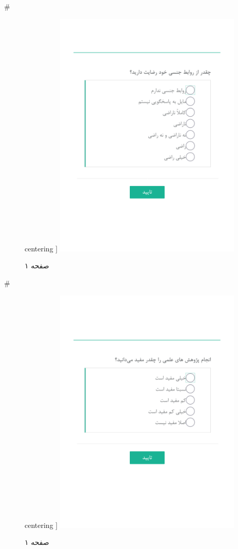 { 
 # 
\begin{figure}[htpb]
centering ]
\includegraphics[width=0.8\textwidth]{./img/Task21.png/}
\caption{صفحه ۱}
\label{fig:Task1}
\end{figure}
 
 
 # 
\begin{figure}[htpb]
centering ]
\includegraphics[width=0.8\textwidth]{./img/Task22.png/}
\caption{صفحه ۱}
\label{fig:Task1}
\end{figure}
 
}
